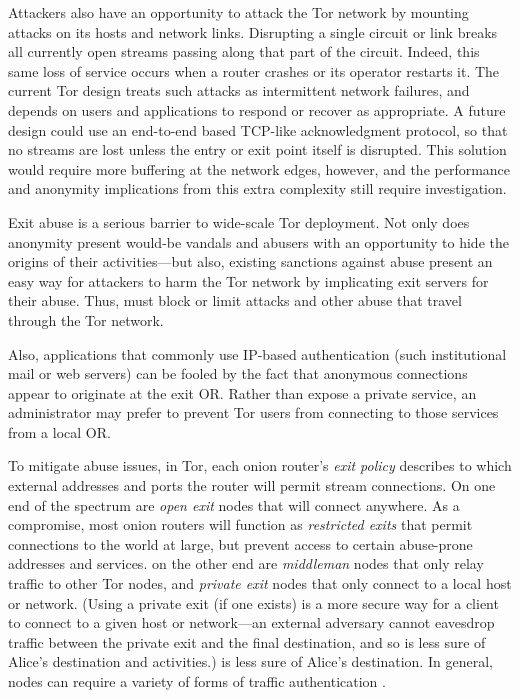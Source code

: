\documentclass[times,10pt,twocolumn]{article}
\begin{document}

Attackers also have an opportunity to attack the Tor network by mounting
attacks on its hosts and network links. Disrupting a single circuit or
link breaks all currently open streams passing along that part of the
circuit. Indeed, this same loss of service occurs when a router crashes
or its operator restarts it. The current Tor design treats such attacks
as intermittent network failures, and depends on users and applications
to respond or recover as appropriate. A future design could use an
end-to-end based TCP-like acknowledgment protocol, so that no streams are
lost unless the entry or exit point itself is disrupted. This solution
would require more buffering at the network edges, however, and the
performance and anonymity implications from this extra complexity still
require investigation.

\label{subsec:exitpolicies}

Exit abuse is a serious barrier to wide-scale Tor deployment.  Not
only does anonymity present would-be vandals and abusers with an
opportunity to hide the origins of their activities---but also,
existing sanctions against abuse present an easy way for attackers to
harm the Tor network by implicating exit servers for their abuse.
Thus, must block or limit attacks and other abuse that travel through
the Tor network.

Also, applications that commonly use IP-based authentication (such
institutional mail or web servers) can be fooled by the fact that
anonymous connections appear to originate at the exit OR.  Rather than
expose a private service, an administrator may prefer to prevent Tor
users from connecting to those services from a local OR.

To mitigate abuse issues, in Tor, each onion router's \emph{exit
  policy} describes to which external addresses and ports the router
will permit stream connections. On one end of the spectrum are
\emph{open exit} nodes that will connect anywhere.  As a compromise,
most onion routers will function as \emph{restricted exits} that
permit connections to the world at large, but prevent access to
certain abuse-prone addresses and services.  on the other end are
\emph{middleman} nodes that only relay traffic to other Tor nodes, and
\emph{private exit} nodes that only connect to a local host or
network.  (Using a private exit (if one exists) is a more secure way
for a client to connect to a given host or network---an external
adversary cannot eavesdrop traffic between the private exit and the
final destination, and so is less sure of Alice's destination and
activities.)  is less sure of Alice's destination. In general,
nodes can require a variety of forms of traffic authentication
\cite{or-discex00}.
\end{document}
